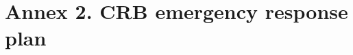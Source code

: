 \documentclass[twocolumn,letterpaper]{scrartcl}
\begin{document}
\section{Annex 2.  CRB emergency response plan}
%
%
%
%
%
%
%
%
%
%
%
%
%
%
%
%
%
%
%
%
%
%
%
%
% 
%
% 
%
% 
%
%
%
%
%
%
%
%
%
%
%
\end{document}
